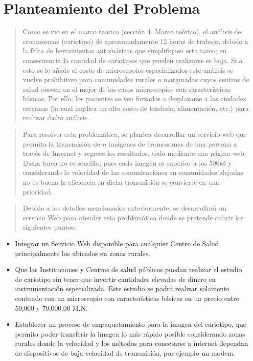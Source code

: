 \documentclass[12pt,letterpaper,titlepage]{article}
\begin{document}

\section{Planteamiento del Problema}\label{planteamientoproblema}


\begin{quotation}
Como se vio en el marco teórico (sección 4. Marco teórico), el análisis de cromosomas (cariotipo) de aproximadamente 12 horas de trabajo, debido a la falta de herramientas automáticas que simplifiquen esta tarea; en consecuencia la cantidad de cariotipos que pueden realizarse es baja. Si a esto se le añade el costo de microscopios especializados este análisis se vuelve prohibitivo para comunidades rurales o marginadas cuyos centros de salud poseen en el mejor de los casos microscopios con características básicas. Por ello, los pacientes se ven forzados a desplazarse a las ciudades cercanas (lo cual implica un alto costo de traslado, alimentación, etc.) para realizar dicho análisis.
\end{quotation}

\begin{quotation}
Para resolver esta problemática, se plantea desarrollar un servicio web que permita la transmisión de $n$ imágenes de cromosomas de una persona a través de Internet y regrese los resultados, todo mediante una página web. Dicha tarea no es sencilla, pues cada imagen es superior a los $500kb$ y considerando la velocidad de las comunicaciones en comunidades alejadas no es buena la eficiencia en dicha transmisión se convierte en una prioridad.
\end{quotation}

\begin{quotation}
Debido a los detalles mencionados anteriormente, se desarrollará un servicio Web para atender esta problemática donde se pretende cubrir los siguientes puntos:
\end{quotation}


\begin{itemize}  %
\item  Integrar un Servicio Web disponible para cualquier Centro de Salud principalmente los ubicados en zonas rurales.
\item  Que las Instituciones y Centros de salud públicos puedan realizar el estudio de cariotipo sin tener que invertir cantidades elevadas de dinero en instrumentación especializada. Este estudio se podrá realizar solamente contando con un microscopio con características básicas en un precio entre 50,000 y 70,000.00 M.N.
\item  Establecer un proceso de empaquetamiento para la imagen del cariotipo, que permita poder transferir la imagen lo más rápido posible considerando zonas rurales donde la velocidad y los métodos para conectarse a internet dependan de dispositivos de baja velocidad de transmisión, por ejemplo un modem.
\end{itemize}
\end{document}
